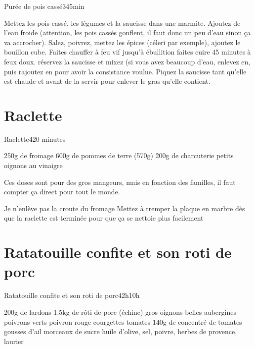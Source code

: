 {\begin{recette}{Purée de pois cassé}{3}{45min}{}
\begin{preparation}
\etape Mettez les pois cassé, les légumes et la saucisse dans une marmite. Ajoutez de l'eau froide (attention, les pois cassés gonflent, il faut donc un peu d'eau sinon ça va accrocher). Salez, poivrez, mettez les 
épices (céleri par exemple), ajoutez le bouillon cube. 
\etape Faites chauffer à feu vif jusqu'à ébullition
\etape faites cuire 45 minutes à feux doux.
\etape réservez la saucisse et mixez (si vous avez beaucoup d'eau, enlevez en, puis rajoutez en pour avoir la consistance 
voulue.
\etape Piquez la saucisse tant qu'elle est chaude et avant de la servir pour enlever le gras qu'elle contient. 
\end{preparation}

\end{recette}


\section{Raclette}
\begin{recette}{Raclette}{4}{20 minutes}{}
\begin{ingredients}
\ingredient 250g de fromage
\ingredient 600g de pommes de terre (570g)
\ingredient 200g de charcuterie
\ingredient petits oignons au vinaigre
\begin{remarque}
 Ces doses sont pour des gros mangeurs, mais en fonction des familles, il faut compter ça direct pour tout le monde.
\end{remarque}

\end{ingredients}

\begin{preparation}
\etape Je n'enlève pas la croute du fromage
\etape Mettez à tremper la plaque en marbre dès que la raclette est terminée pour que ça se nettoie plus facilement
\end{preparation}
\end{recette}

\section{Ratatouille confite et son roti de porc}
\begin{recette}{Ratatouille confite et son roti de porc}{4}{2h}{10h}
\begin{ingredients}
\ingredient 200g de lardons %
\ingredient 1.5kg de rôti de porc (échine)
 gros oignons
 belles aubergines
 poivrons verts
 poivron rouge
 courgettes
 tomates
\ingredient 140g de concentré de tomates
 gousses d'ail
 morceaux de sucre
\ingredient huile d'olive, sel, poivre, herbes de provence, laurier
\end{ingredients}


\end{recette}}
